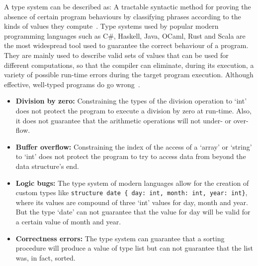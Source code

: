 \documentclass[english, lmodern, oneside, nopageanchorhack]{ufsc-thesis-rn46-2019}
\begin{document}
A type system can be described as: A tractable syntactic method for proving the absence of certain program behaviours by classifying phrases according to the kinds of values they compute~\cite{pierce2002types}.
Type systems used by popular modern programming languages such as C\#, Haskell, Java, OCaml, Rust and Scala are the most widespread tool used to guarantee the correct behaviour of a program.
They are mainly used to describe valid sets of values that can be used for different computations, so that the compiler can eliminate, during its execution, a variety of possible run-time errors during the target program execution.
Although effective, well-typed programs do go wrong~\cite{jhala2020refinement}.

\begin{itemize}
  \item \textbf{Division by zero:} Constraining the types of the division operation to `int' does not protect the program to execute a division by zero at run-time.
Also, it does not guarantee that the arithmetic operations will not under- or over-flow.
  \item \textbf{Buffer overflow:} Constraining the index of the access of a `array' or `string' to `int' does not protect the program to try to access data from beyond the data structure's end.
  \item \textbf{Logic bugs:} The type system of modern languages allow for the creation of custom types like \verb+structure date { day: int, month: int, year: int}+, where its values are compound of three `int' values for day, month and year.
But the type `date' can not guarantee that the value for day will be valid for a certain value of month and year.
  \item \textbf{Correctness errors:} The type system can guarantee that a sorting procedure will produce a value of type list  but can not guarantee that the list was, in fact, sorted.
\end{itemize}
\end{document}
